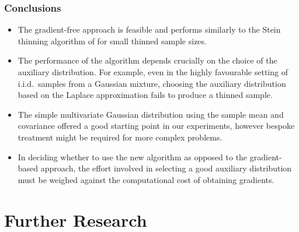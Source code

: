 \documentclass{beamer}
\begin{document}
\begin{frame}
\frametitle{Conclusions}

\begin{itemize}
\item The gradient-free approach is feasible and performs similarly to the Stein thinning algorithm of \cite{riabizOptimalThinningMCMC2022} for small thinned sample sizes.
\item The performance of the algorithm depends crucially on the choice of the auxiliary distribution. For example, even in the highly favourable setting of i.i.d.\ samples from a Gaussian mixture, choosing the auxiliary distribution based on the Laplace approximation fails to produce a thinned sample.
\item The simple multivariate Gaussian distribution using the sample mean and covariance offered a good starting point in our experiments, however bespoke treatment might be required for more complex problems.
\item In deciding whether to use the new algorithm as opposed to the gradient-based approach, the effort involved in selecting a good auxiliary distribution must be weighed against the computational cost of obtaining gradients.
\end{itemize}

\end{frame}



\section{Further Research}
\end{document}

